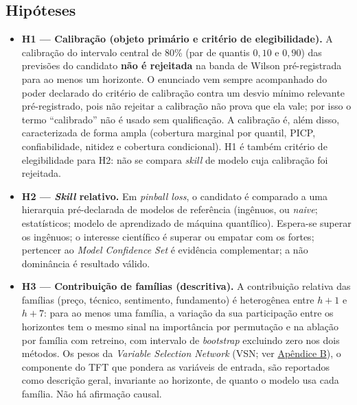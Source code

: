\subsection{Hipóteses}\label{sec:hipoteses}
\begin{itemize}
    \item \textbf{H1 --- Calibração (objeto primário e critério de elegibilidade).} A calibração do intervalo central de 80\% (par de quantis \(0{,}10\) e \(0{,}90\)) das previsões do candidato \textbf{não é rejeitada} na banda de Wilson pré-registrada para ao menos um horizonte. O enunciado vem sempre acompanhado do poder declarado do critério de calibração contra um desvio mínimo relevante pré-registrado, pois não rejeitar a calibração não prova que ela vale; por isso o termo ``calibrado'' não é usado sem qualificação. A calibração é, além disso, caracterizada de forma ampla (cobertura marginal por quantil, PICP, confiabilidade, nitidez e cobertura condicional). H1 é também critério de elegibilidade para H2: não se compara \textit{skill} de modelo cuja calibração foi rejeitada.
    \item \textbf{H2 --- \textit{Skill} relativo.} Em \textit{pinball loss}, o candidato é comparado a uma hierarquia pré-declarada de modelos de referência (ingênuos, ou \textit{naive}; estatísticos; modelo de aprendizado de máquina quantílico). Espera-se superar os ingênuos; o interesse científico é superar ou empatar com os fortes; pertencer ao \textit{Model Confidence Set} é evidência complementar; a não dominância é resultado válido.
    \item \textbf{H3 --- Contribuição de famílias (descritiva).} A contribuição relativa das famílias (preço, técnico, sentimento, fundamento) é heterogênea entre \(h+1\) e \(h+7\): para ao menos uma família, a variação da sua participação entre os horizontes tem o mesmo sinal na importância por permutação e na ablação por família com retreino, com intervalo de \textit{bootstrap} excluindo zero nos dois métodos. Os pesos da \textit{Variable Selection Network} (VSN; ver \hyperref[gl:vsn]{Apêndice B}), o componente do TFT que pondera as variáveis de entrada, são reportados como descrição geral, invariante ao horizonte, de quanto o modelo usa cada família. Não há afirmação causal.
\end{itemize}

